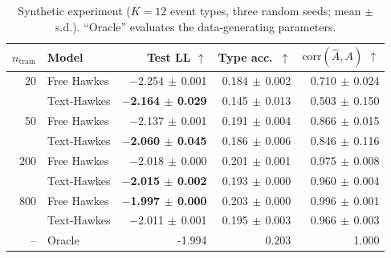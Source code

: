 \begin{table}[t]
\centering
\caption{Synthetic experiment ($K=12$ event types, three random seeds; mean $\pm$ s.d.). ``Oracle'' evaluates the data-generating parameters.}
\label{tab:synthetic}
\small
\begin{tabular}{rlrrr}
\toprule
$n_{\mathrm{train}}$ & Model & Test LL $\uparrow$ & Type acc.\ $\uparrow$ & $\mathrm{corr}(\hat A,A)$ $\uparrow$ \\
\midrule
20 & Free Hawkes & $-$2.254{\scriptsize$\,\pm\,$0.001} & 0.184{\scriptsize$\,\pm\,$0.002} & 0.710{\scriptsize$\,\pm\,$0.024} \\
 & Text-Hawkes & \textbf{$-$2.164{\scriptsize$\,\pm\,$0.029}} & 0.145{\scriptsize$\,\pm\,$0.013} & 0.503{\scriptsize$\,\pm\,$0.150} \\
\midrule
50 & Free Hawkes & $-$2.137{\scriptsize$\,\pm\,$0.001} & 0.191{\scriptsize$\,\pm\,$0.004} & 0.866{\scriptsize$\,\pm\,$0.015} \\
 & Text-Hawkes & \textbf{$-$2.060{\scriptsize$\,\pm\,$0.045}} & 0.186{\scriptsize$\,\pm\,$0.006} & 0.846{\scriptsize$\,\pm\,$0.116} \\
\midrule
200 & Free Hawkes & $-$2.018{\scriptsize$\,\pm\,$0.000} & 0.201{\scriptsize$\,\pm\,$0.001} & 0.975{\scriptsize$\,\pm\,$0.008} \\
 & Text-Hawkes & \textbf{$-$2.015{\scriptsize$\,\pm\,$0.002}} & 0.193{\scriptsize$\,\pm\,$0.000} & 0.960{\scriptsize$\,\pm\,$0.004} \\
\midrule
800 & Free Hawkes & \textbf{$-$1.997{\scriptsize$\,\pm\,$0.000}} & 0.203{\scriptsize$\,\pm\,$0.000} & 0.996{\scriptsize$\,\pm\,$0.001} \\
 & Text-Hawkes & $-$2.011{\scriptsize$\,\pm\,$0.001} & 0.195{\scriptsize$\,\pm\,$0.003} & 0.966{\scriptsize$\,\pm\,$0.003} \\
\midrule
-- & Oracle & -1.994 & 0.203 & 1.000 \\
\bottomrule
\end{tabular}
\end{table}